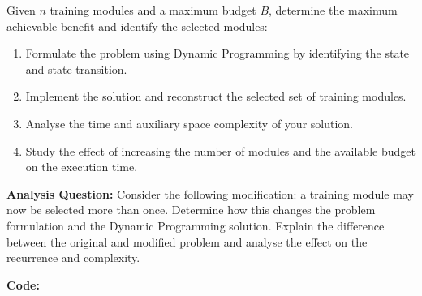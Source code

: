 \documentclass[12pt]{article}
\begin{document}
Given $n$ training modules and a maximum budget $B$, determine the maximum achievable benefit and identify the selected modules:
\begin{enumerate}
    \item Formulate the problem using Dynamic Programming by identifying the state and state transition.
    \item Implement the solution and reconstruct the selected set of training modules.
    \item Analyse the time and auxiliary space complexity of your solution.
    \item Study the effect of increasing the number of modules and the available budget on the execution time.
\end{enumerate}

\textbf{Analysis Question:}
Consider the following modification: a training module may now be selected more than once. Determine how this changes the problem formulation and the Dynamic Programming solution. Explain the difference between the original and modified problem and analyse the effect on the recurrence and complexity.

\vspace{0.3cm}

\textbf{Code:}
\end{document}
